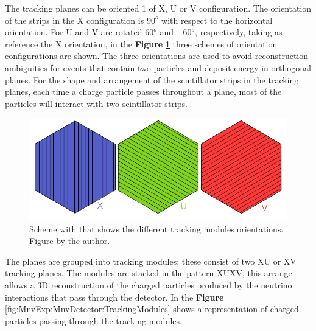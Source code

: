 The tracking planes can be oriented 1 of X, U or V configuration. The orientation of the strips in the X configuration is $90^o$ with respect to the horizontal orientation. For U and V are rotated $60^o$ and $-60^o$, respectively, taking as reference the X orientation, in the \textbf{Figure} \ref{fig:MnvExp:MnvDetector:PlanesOrientations} three schemes of orientation configurations are shown. The three orientations are used to avoid reconstruction ambiguities for events that contain two particles and deposit energy in orthogonal planes. For the shape and arrangement of the scintillator strips in the tracking planes, each time a charge particle passes throughout a plane, most of the particles will interact with two scintillator strips. 

\begin{figure}[!htb]
\centering
\includegraphics[scale=0.4]{Figures/Chapter2/PlanesOrientation.png}

        \caption{Scheme with that shows the different tracking modules orientations. Figure by the author.} 
\label{fig:MnvExp:MnvDetector:PlanesOrientations}
\end{figure}

The planes are grouped into tracking modules; these consist of two XU or XV tracking planes. The modules are stacked in the pattern XUXV, this arrange allows a 3D reconstruction of the charged particles produced by the neutrino interactions that pass through the detector. In the \textbf{Figure} \ref{fig:MnvExp:MnvDetector:TrackingModules} shows a representation of charged particles passing through the tracking modules. 

